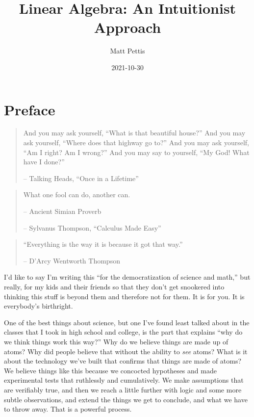 \documentclass[
]{book}
\title{Linear Algebra: An Intuitionist Approach}
\author{Matt Pettis}
\date{2021-10-30}
\begin{document}
\maketitle

{
\setcounter{tocdepth}{1}
\tableofcontents
}
\hypertarget{preface}{%
\chapter{Preface}\label{preface}}

\begin{quote}
And you may ask yourself, ``What is that beautiful house?''
And you may ask yourself, ``Where does that highway go to?''
And you may ask yourself, ``Am I right? Am I wrong?''
And you may say to yourself, ``My God! What have I done?''

-- Talking Heads, ``Once in a Lifetime''
\end{quote}

\begin{quote}
What one fool can do, another can.

-- Ancient Simian Proverb

-- Sylvanus Thompson, ``Calculus Made Easy''
\end{quote}

\begin{quote}
``Everything is the way it is because it got that way.''

-- D'Arcy Wentworth Thompson
\end{quote}

I'd like to say I'm writing this ``for the democratization of science and math,'' but really, for my kids and their friends so that they don't get snookered into thinking this stuff is beyond them and therefore not for them. It is for you. It is everybody's birthright.

One of the best things about science, but one I've found least talked about in the classes that I took in high school and college, is the part that explains ``why do we think things work this way?'' Why do we believe things are made up of atoms? Why did people believe that without the ability to \emph{see} atoms? What is it about the technology we've built that confirms that things are made of atoms? We believe things like this because we concocted hypotheses and made experimental tests that ruthlessly and cumulatively. We make assumptions that are verifiably true, and then we reach a little further with logic and some more subtle observations, and extend the things we get to conclude, and what we have to throw away. That is a powerful process.
\end{document}
